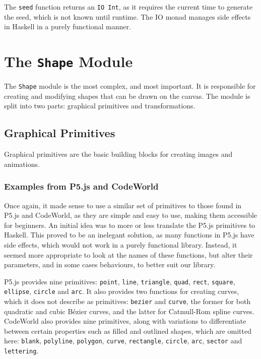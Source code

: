\documentclass[../main.tex]{subfiles}
\begin{document}
            The \texttt{seed} function returns an \texttt{IO Int}, as it requires the
                current time to generate the seed, which is not known until runtime.
            The IO monad manages side effects in Haskell in a purely functional manner.

    \section{The \texttt{Shape}
        Module} The \texttt{Shape} module is the most complex, and most important.
        It is responsible for creating and modifying shapes that can be drawn on the
            canvas.
        The module is split into two parts: graphical primitives and transformations.

        \subsection{Graphical Primitives}
            Graphical primitives are the basic building blocks for creating images and
                animations.

            \subsubsection{Examples from P5.js and CodeWorld}
                Once again, it made sense to use a similar set of primitives to those found in
                    P5.js and CodeWorld, as they are simple and easy to use, making them accessible
                    for beginners.
                An initial idea was to more or less translate the P5.js primitives to Haskell.
                This proved to be an inelegant solution, as many functions in P5.js have side
                    effects, which would not work in a purely functional library.
                Instead, it seemed more appropriate to look at the names of these functions,
                    but alter their parameters, and in some cases behaviours, to better suit our
                    library.

                P5.js provides nine primitives: \texttt{point}, \texttt{line},
                    \texttt{triangle}, \texttt{quad}, \texttt{rect}, \texttt{square},
                    \texttt{ellipse}, \texttt{circle} and \texttt{arc}.
                It also provides two functions for creating curves, which it does not describe
                    as primitives: \texttt{bezier} and \texttt{curve}, the former for both
                    quadratic and cubic Bézier curves, and the latter for Catmull-Rom spline
                    curves.
                CodeWorld also provides nine primitives, along with variations to differentiate
                    between certain properties such as filled and outlined shapes, which are
                    omitted here: \texttt{blank}, \texttt{polyline}, \texttt{polygon},
                    \texttt{curve}, \texttt{rectangle}, \texttt{circle}, \texttt{arc},
                    \texttt{sector} and \texttt{lettering}.
\end{document}
